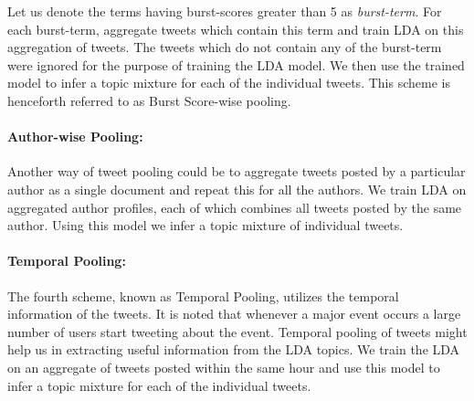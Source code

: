 \documentclass[10pt,a5paper,twoside]{article}
\begin{document}
Let us denote the terms having burst-scores greater than 5 as \textit{burst-term}. For each burst-term, aggregate tweets which contain this term and train LDA on this aggregation of tweets. The tweets which do not contain any of the burst-term were ignored for the purpose of training the LDA model. We then use the trained model to infer a topic mixture for each of the individual tweets. This scheme is henceforth referred to as Burst Score-wise pooling.

\paragraph{Author-wise Pooling: }
Another way of tweet pooling could be to aggregate tweets posted by a particular author as a single document and repeat this for all the authors\cite{Weng2010wsdm}. We train LDA on aggregated author profiles, each of which combines all tweets posted by the same author. Using this model we infer a topic mixture of individual tweets.

\paragraph{Temporal Pooling: }
The fourth scheme, known as Temporal Pooling, utilizes the temporal information of the tweets. It is noted that whenever a major event occurs a large number of users start tweeting about the event. Temporal pooling of tweets might help us in extracting useful information from the LDA topics. We train the LDA on an aggregate of tweets posted within the same hour and use this model to infer a topic mixture for each of the individual tweets.
\end{document}
